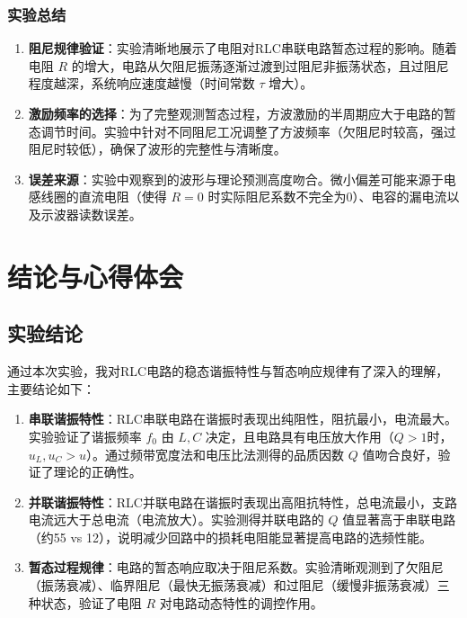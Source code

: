 \documentclass[11pt]{article}
\begin{document}
\subsubsection{实验总结}
\begin{enumerate}
    \item \textbf{阻尼规律验证}：实验清晰地展示了电阻对RLC串联电路暂态过程的影响。随着电阻 $R$ 的增大，电路从欠阻尼振荡逐渐过渡到过阻尼非振荡状态，且过阻尼程度越深，系统响应速度越慢（时间常数 $\tau$ 增大）。
    
    \item \textbf{激励频率的选择}：为了完整观测暂态过程，方波激励的半周期应大于电路的暂态调节时间。实验中针对不同阻尼工况调整了方波频率（欠阻尼时较高，强过阻尼时较低），确保了波形的完整性与清晰度。
    
    \item \textbf{误差来源}：实验中观察到的波形与理论预测高度吻合。微小偏差可能来源于电感线圈的直流电阻（使得 $R=0$ 时实际阻尼系数不完全为0）、电容的漏电流以及示波器读数误差。
\end{enumerate}

\section{结论与心得体会}

\subsection{实验结论}
通过本次实验，我对RLC电路的稳态谐振特性与暂态响应规律有了深入的理解，主要结论如下：
\begin{enumerate}
    \item \textbf{串联谐振特性}：RLC串联电路在谐振时表现出纯阻性，阻抗最小，电流最大。实验验证了谐振频率 $f_0$ 由 $L, C$ 决定，且电路具有电压放大作用（$Q > 1$时，$u_L, u_C > u$）。通过频带宽度法和电压比法测得的品质因数 $Q$ 值吻合良好，验证了理论的正确性。
    \item \textbf{并联谐振特性}：RLC并联电路在谐振时表现出高阻抗特性，总电流最小，支路电流远大于总电流（电流放大）。实验测得并联电路的 $Q$ 值显著高于串联电路（约55 vs 12），说明减少回路中的损耗电阻能显著提高电路的选频性能。
    \item \textbf{暂态过程规律}：电路的暂态响应取决于阻尼系数。实验清晰观测到了欠阻尼（振荡衰减）、临界阻尼（最快无振荡衰减）和过阻尼（缓慢非振荡衰减）三种状态，验证了电阻 $R$ 对电路动态特性的调控作用。
\end{enumerate}
\end{document}
